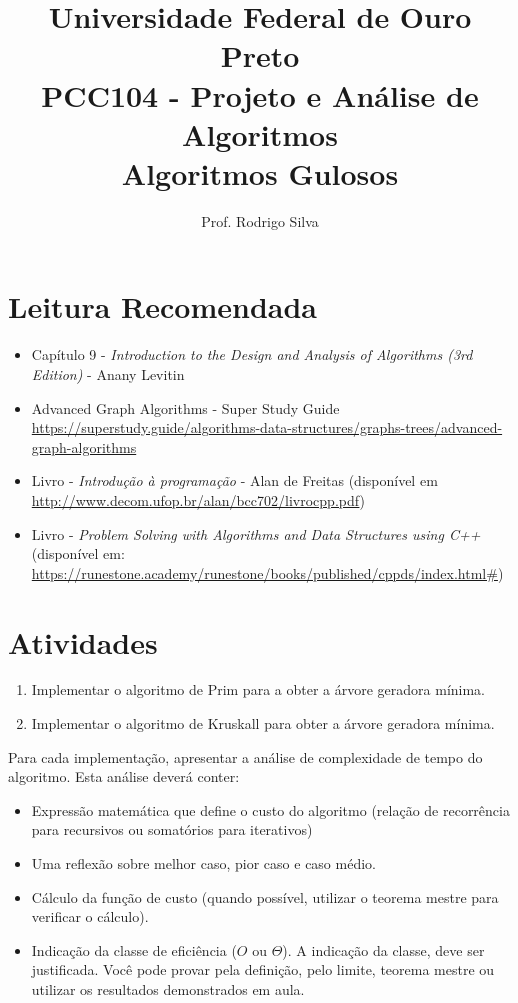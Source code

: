 \documentclass{article}
\title{\vspace{-2 cm}Universidade Federal de Ouro Preto \\ PCC104 - Projeto e Análise de Algoritmos \\ Algoritmos Gulosos}
\author{Prof. Rodrigo Silva}
\begin{document}
\maketitle

\section*{Leitura Recomendada}

\begin{itemize}
    \item Capítulo 9 - \textit{Introduction to the Design and Analysis of Algorithms (3rd Edition)} - Anany Levitin 
    \item Advanced Graph Algorithms - Super Study Guide \url{https://superstudy.guide/algorithms-data-structures/graphs-trees/advanced-graph-algorithms}
    \item Livro - \textit{Introdução à programação} - Alan de Freitas (disponível em \url{http://www.decom.ufop.br/alan/bcc702/livrocpp.pdf})
    \item Livro - \textit{Problem Solving with Algorithms and Data Structures using C++} (disponível em: \url{https://runestone.academy/runestone/books/published/cppds/index.html#})
\end{itemize}


\section{Atividades}

\begin{enumerate}
    \item Implementar o algoritmo de Prim para a obter a árvore geradora mínima.
    \item Implementar o algoritmo de Kruskall para obter a árvore geradora mínima. 
\end{enumerate}

Para cada implementação, apresentar a análise de complexidade de tempo do algoritmo. Esta análise deverá conter:

\begin{itemize}
    \item Expressão matemática que define o custo do algoritmo (relação de recorrência para recursivos ou somatórios para iterativos) 
    \item Uma reflexão sobre melhor caso, pior caso e caso médio.
    \item Cálculo da função de custo (quando possível, utilizar o teorema mestre para verificar o cálculo).
    \item Indicação da classe de eficiência ($O$ ou $\Theta$). A indicação da classe, deve ser justificada. Você pode provar pela definição, pelo limite, teorema mestre ou utilizar os resultados demonstrados em aula.
\end{itemize}


%
%
\end{document}
